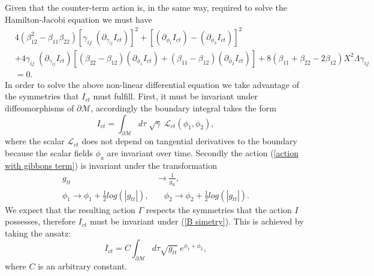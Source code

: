 \documentclass[sn-mathphys,Numbered]{sn-jnl}%
\theoremstyle{thmstyleone}%
\theoremstyle{thmstyletwo}%
\theoremstyle{thmstylethree}%
\begin{document}
Given that the counter-term action is, in the same way, required to solve the Hamilton-Jacobi equation we must have
%
\begin{equation}\label{Hamilton-Jacobi Ict}
\begin{aligned}
&4\left(\beta_{12}^{2}-\beta_{11} \beta_{22}\right)\left[\gamma_{i j}\; \left(\partial_{\gamma_{i j}}I_{ct}\right)\right]^{2}+\left[\left(\partial_{\phi_{1}}I_{ct}\right)-\left(\partial_ {\phi_{2}}I_{ct}\right)\right]^{2}\\
&+4 \gamma_{i j}\; \left(\partial_{\gamma_{i j}}I_{ct}\right)\left[\left(\beta_{22}-\beta_{12}\right) \left(\partial_{\phi_{1}} I_{ct}\right)+\left(\beta_{11}-\beta_{12}\right) \left(\partial_{\phi_{2}}I_{ct}\right)\right]+8\left(\beta_{11}+\beta_{22}-2 \beta_{12}\right) X^2 \Lambda \gamma_{ij}\\
&=0.
\end{aligned}
\end{equation}
In order to solve the above non-linear differential equation we take advantage of the symmetries that $I_{ct}$ must fulfill.
First, it must be invariant under diffeomorphisms of $\partial \mathcal{M}$, accordingly the boundary integral takes the form 
%
\begin{equation}
    I_{ct}=\int_{\partial \mathcal{M}} d\tau\;\sqrt{\gamma}\; \mathcal{L}_{ct}\left(\phi_1,\phi_2\right),
\end{equation}
%
where the scalar $\mathcal{L}_{ct}$ does not depend on tangential derivatives to the boundary because the scalar fields $\phi_a$ are invariant over time.
Secondly the action (\ref{action with gibbons term}) is invariant under the transformation %
%
\begin{equation} \label{B simetry}
    \begin{aligned}
    g_{tt}&\rightarrow\frac{1}{g_{tt}},\\
    \phi_1 \rightarrow \phi_1+\frac{1}{2} log\left(|g_{tt}|\right), &\quad  \phi_2 \rightarrow \phi_2+\frac{1}{2} log\left(|g_{tt}|\right).
    \end{aligned}
\end{equation}
%
We expect that the resulting action $\Gamma$ respects the symmetries that the action $I$ possesses, therefore $I_{ct}$ must be invariant under (\ref{B simetry}). This is achieved by taking the ansatz:
%
\begin{equation}\label{counter-term}
 I_{ct}=C\int_{\partial\mathcal{M}} d\tau \sqrt{g_{tt}}\; e^{\phi_1+\phi_2},
\end{equation} 
%
where $C$ is an arbitrary constant.
\end{document}
